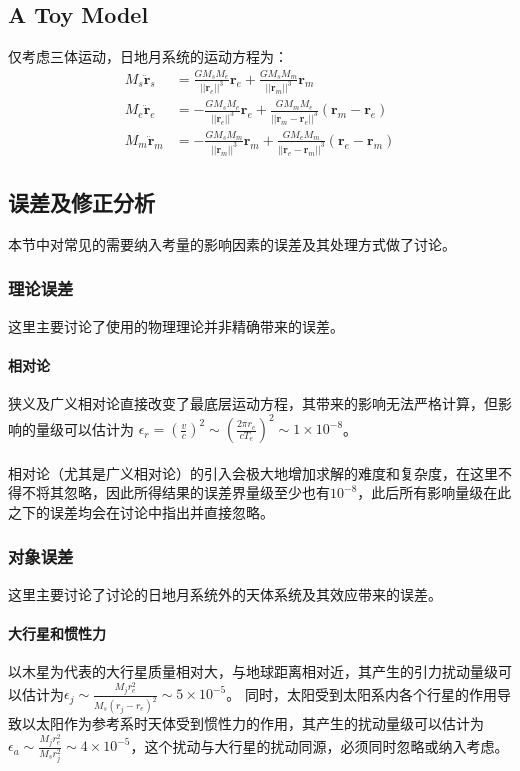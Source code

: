 \documentclass[hidelinks]{article}
\begin{document}
\subsection{A Toy Model}
仅考虑三体运动，日地月系统的运动方程为：
\begin{align*}
    M_s\ddot{\mathbf{r}}_s&=\frac{GM_sM_e}{||\mathbf{r}_e||^3}\mathbf{r}_e+\frac{GM_sM_m}{||\mathbf{r}_m||^3}\mathbf{r}_m\\
    M_e\ddot{\mathbf{r}}_e&=-\frac{GM_sM_e}{||\mathbf{r}_e||^3}\mathbf{r}_e+\frac{GM_mM_e}{||\mathbf{r}_m-\mathbf{r}_e||^3}(\mathbf{r}_m-\mathbf{r}_e)\\
    M_m\ddot{\mathbf{r}}_m&=-\frac{GM_sM_m}{||\mathbf{r}_m||^3}\mathbf{r}_m+\frac{GM_eM_m}{||\mathbf{r}_e-\mathbf{r}_m||^3}(\mathbf{r}_e-\mathbf{r}_m)
\end{align*}
\subsection{误差及修正分析}
本节中对常见的需要纳入考量的影响因素的误差及其处理方式做了讨论。
\subsubsection{理论误差}
这里主要讨论了使用的物理理论并非精确带来的误差。
\paragraph{相对论}
狭义及广义相对论直接改变了最底层运动方程，其带来的影响无法严格计算，但影响的量级可以估计为 $\epsilon_r=(\frac{v}{c})^2\sim(\frac{2\pi r_e}{cT_e})^2\sim1\times10^{-8}$。
\\
\\
相对论（尤其是广义相对论）的引入会极大地增加求解的难度和复杂度，在这里不得不将其忽略，因此所得结果的误差界量级至少也有$10^{-8}$，此后所有影响量级在此之下的误差均会在讨论中指出并直接忽略。
\subsubsection{对象误差}
这里主要讨论了讨论的日地月系统外的天体系统及其效应带来的误差。
\paragraph{大行星和惯性力}
以木星为代表的大行星质量相对大，与地球距离相对近，其产生的引力扰动量级可以估计为$\epsilon_j\sim\frac{M_jr_e^2}{M_s(r_j-r_e)^2}\sim5\times10^{-5}$。
同时，太阳受到太阳系内各个行星的作用导致以太阳作为参考系时天体受到惯性力的作用，其产生的扰动量级可以估计为$\epsilon_a\sim\frac{M_jr_e^2}{M_sr_j^2}\sim4\times10^{-5}$，这个扰动与大行星的扰动同源，必须同时忽略或纳入考虑。
\end{document}
